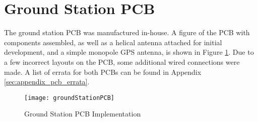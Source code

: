 \graphicspath{{./figures}}

\section{Ground Station PCB}

The ground station PCB was manufactured in-house. A figure of the PCB with components assembled, as well as a helical antenna attached for initial development, and a simple monopole GPS antenna, is shown in Figure \ref{fig:groundStationPCB}. Due to a few incorrect layouts on the PCB, some additional wired connections were made. A list of errata for both PCBs can be found in Appendix \ref{sec:appendix_pcb_errata}.

\begin{figure}[!htb]
  \centering
  \texttt{[image: groundStationPCB]}
  \caption{Ground Station PCB Implementation}
  \label{fig:groundStationPCB}
\end{figure}